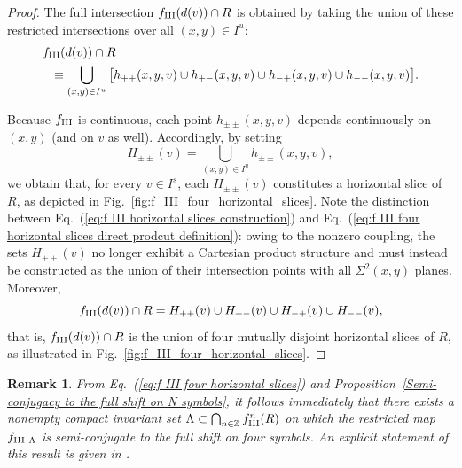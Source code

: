 \documentclass[12pt]{iopart}
\newtheorem*{remark}{Remark}
\begin{document}
\begin{proof}
The full intersection \( f_{\rm III}(d(v)) \cap R \) is obtained by taking the union of these restricted intersections over all \( (x,y)\in I^u \):
\begin{eqnarray}
&f_{\rm III}(d(v)) \cap R \nonumber \\
&~~\equiv \bigcup_{(x,y)\in I^u} \big[ h_{++}(x,y,v) \cup h_{+-}(x,y,v) \cup h_{-+}(x,y,v) \cup h_{--}(x,y,v) \big].
\label{eq:f III four horizontal slices}
\end{eqnarray}





Because \( f_{\rm III} \) is continuous, each point \( h_{\pm\pm}(x,y,v) \) depends continuously on \( (x,y) \) (and on \( v \) as well).  
Accordingly, by setting
\begin{equation}
H_{\pm\pm}(v) = \bigcup_{(x,y)\in I^u} h_{\pm\pm}(x,y,v), \label{eq:f III horizontal slices construction}
\end{equation}
we obtain that, for every \( v \in I^s \), each \( H_{\pm\pm}(v) \) constitutes a horizontal slice of \( R \), as depicted in Fig.~\ref{fig:f_III_four_horizontal_slices}. Note the distinction between Eq.~(\ref{eq:f III horizontal slices construction}) and Eq.~(\ref{eq:f III four horizontal slices direct prodcut definition}): owing to the nonzero coupling, the sets $H_{\pm\pm}(v)$ no longer exhibit a Cartesian product structure and must instead be constructed as the union of their intersection points with all $\Sigma^2(x,y)$ planes. 
Moreover,
\begin{equation}
f_{\rm III}(d(v)) \cap R = H_{++}(v) \cup H_{+-}(v) \cup H_{-+}(v) \cup H_{--}(v), \label{eq:f III four horizontal slices}
\end{equation}
that is, \( f_{\rm III}(d(v)) \cap R \) is the union of four mutually disjoint horizontal slices of \( R \), as illustrated in Fig.~\ref{fig:f_III_four_horizontal_slices}. 

\end{proof}

\begin{remark}
From Eq.~(\ref{eq:f III four horizontal slices}) and Proposition~\ref{Semi-conjugacy to the full shift on N symbols}, it follows immediately that there exists a nonempty compact invariant set \( \Lambda \subset \bigcap_{n \in \mathbb{Z}} f^n_{\rm III}(R) \) on which the restricted map \( f_{\rm III}|_{\Lambda} \) is semi-conjugate to the full shift on four symbols. An explicit statement of this result is given in \cite{Fujioka25}.
\end{remark}
\end{document}
